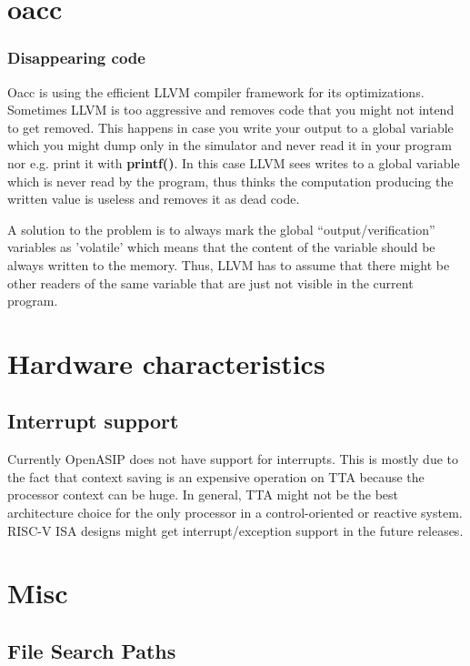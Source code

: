 \documentclass[a4paper,twoside]{tceusermanual}
\begin{document}
\section{oacc}

\subsubsection{Disappearing code}

Oacc is using the efficient LLVM compiler framework for its optimizations.
Sometimes LLVM is too aggressive and removes code that you might not
intend to get removed. This happens in case you write your output to a
global variable which you might dump only in the simulator and never read 
it in your program nor e.g. print it with \textbf{printf()}. In this case 
LLVM sees writes to a global variable which is never read by the program, 
thus thinks the computation producing the written value is useless and 
removes it as dead code.

A solution to the problem is to always mark the global ``output/verification'' 
variables as 'volatile' which means that the content of the variable should 
be always written to the memory. Thus, LLVM has to assume that there might 
be other readers of the same variable that are just not visible in the 
current program.

\section{Hardware characteristics}

\subsection{Interrupt support}

Currently OpenASIP does not have support for interrupts. This is mostly due to
the fact that context saving is an expensive operation on TTA because the
processor context can be huge. In general, TTA might not be the best
architecture choice for the only processor in a control-oriented or reactive
system. RISC-V ISA designs might get interrupt/exception support in the future
releases.

\section{Misc}

\subsection{File Search Paths}
\end{document}
